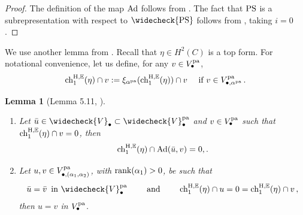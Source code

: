 \documentclass[11pt]{amsart}
\newtheorem{lemma}[theorem]{Lemma}
\theoremstyle{remark}
\newcommand{\E}{\mathbb{E}}
\newcommand{\rk}{\textnormal{rank}}
\newcommand{\pa}[0]{\textnormal{pa}}
\newcommand{\chhE}[0]{\textnormal{ch}^{\textnormal{H},\E}}
\newcommand{\ad}[0]{\textnormal{Ad}}
\newcommand{\PS}{\textnormal{PS}}
\numberwithin{theorem}{section}
\begin{document}
    \begin{proof}
    The definition of the map $\ad$ follows from \cite[Lemma 3.12]{BLM24}.
    The fact that $\PS$ is a subrepresentation with respect to $\widecheck{\PS}$ follows from \cite[Proposition 3.13]{BLM24}, taking $i=0$.
    \end{proof}  
    We use another lemma from \cite{BLM24}.
    Recall that $\eta \in H^2(C)$ is a top form.
    For notational convenience, 
    let us define, for any $v \in V^\pa_\bullet$,
    $$\chhE_1(\eta) \cap v := \xi_{\alpha^\pa}(\chhE_1(\eta)) \cap v
    \quad \text{ if } v \in V^\pa_{\bullet, \alpha^\pa}\,.$$ 
    \begin{lemma}[Lemma 5.11, \cite{BLM24}]\label{Lemma 5.11 of BLM}
        \begin{enumerate}
            \item Let $\bar{u} \in \widecheck{V}_\bullet \subset \widecheck{V}^\pa_\bullet$ and 
            $v \in V^\pa_\bullet$ such that 
            $\chhE_1(\eta) \cap v = 0$, then
            $$\chhE_1(\eta) \cap \ad(\bar{u},v) = 0,.$$
            \item Let $u,v \in V^\pa_{\bullet, (\alpha_1,\alpha_2)}$, 
            with $\rk(\alpha_1) > 0$, be such that 
            $$\bar{u}= \bar{v} \, \text{ in } \widecheck{V}^\pa_\bullet \qquad
            \text{ and } \qquad
            \chhE_1(\eta) \cap u = 0 = \chhE_1(\eta) \cap v\,,$$
            then $u = v$ in $V^\pa_\bullet$.
        \end{enumerate}
    \end{lemma}
    
\end{document}
